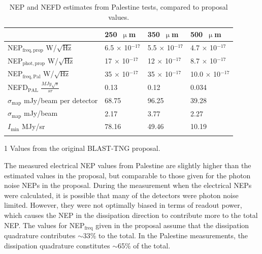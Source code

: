 \begin{table}[!htbp]
  \begin{threeparttable}
\centering
\caption{NEP and NEFD estimates from Palestine tests, compared to proposal values.}
\label{table:NEP comparison}
\begin{tabular}{@{}llll@{}}
\dtoprule{}
 & 250~$\upmu$m & 350~$\upmu$m & 500~$\upmu$m \\ \midrule
NEP$_{\mathrm{freq,prop}}$\tnote{1} W/$\sqrt{\mathrm{Hz}}$ & 6.5 $\times$ 10$^{-17}$ & 5.5 $\times$ 10$^{-17}$ & 4.7 $\times$ 10$^{-17}$ \\
NEP$_{\mathrm{phot,prop}}$ W/$\sqrt{\mathrm{Hz}}$ & 17 $\times$ 10$^{-17}$ & 12 $\times$ 10$^{-17}$ & 8.7 $\times$ 10$^{-17}$ \\
NEP$_{\mathrm{freq,Pal}}$ W/$\sqrt{\mathrm{Hz}}$ & 35 $\times$ 10$^{-17}$ & 35 $\times$ 10$^{-17}$ & 10.0 $\times$ 10$^{-17}$ \\
NEFD$_{\mathrm{PAL}}$ $\frac{MJy\sqrt{s}}{sr}$ & 0.13 & 0.12 & 0.034 \\
$\sigma_{\mathrm{map}}$ mJy/beam per detector & 68.75 & 96.25 & 39.28 \\
$\sigma_{\mathrm{map}}$ mJy/beam & 2.17 & 3.77 & 2.27 \\
$I_{\mathrm{min}}$ MJy/sr & 78.16 & 49.46 & 10.19 \\ \dbottomrule{}
\\
\end{tabular}
\begin{tablenotes}
\item [1] Values from the original BLAST-TNG proposal.
\vspace{2mm}
\end{tablenotes}
\end{threeparttable}
\end{table}

The measured electrical NEP values from Palestine are slightly higher than the estimated values in the proposal, but comparable to those given for the photon noise NEPs in the proposal. During the measurement when the electrical NEPs were calculated, it is possible that many of the detectors were photon noise limited. However, they were not optimally biased in terms of readout power, which causes the NEP in the dissipation direction to contribute more to the total NEP\@. The values for NEP$_{\mathrm{freq}}$ given in the proposal assume that the dissipation quadrature contributes $\sim$33\% to the total. In the Palestine measurements, the dissipation quadrature constitutes $\sim$65\% of the total.

